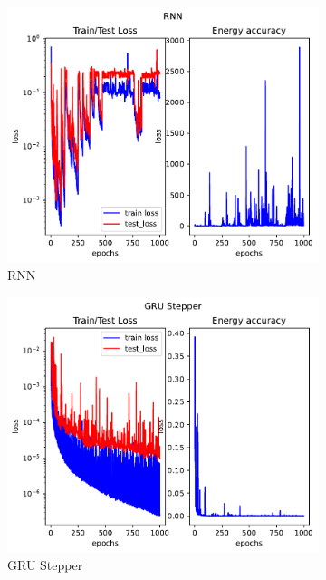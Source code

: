\begin{figure}[H]
	\begin{subfigure}[b]{0.3\textwidth}
		\centering
		\includegraphics[width=\textwidth]{chapters/chapter5/body3_rnn_loss.pdf}
		\caption{RNN}
	\end{subfigure}
	\hfill
	\begin{subfigure}[b]{0.3\textwidth}
		\centering
		\includegraphics[width=\textwidth]{chapters/chapter5/body3_gre_loss.pdf}
		\caption{GRU Stepper}
	\end{subfigure}
	\hfill
	\begin{subfigure}[b]{0.3\textwidth}
		\centering

\end{subfigure}
\end{figure}
